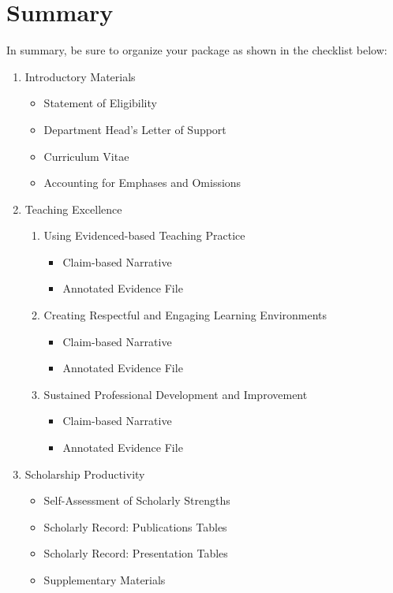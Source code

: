 \documentclass[11pt,titlepage]{article}
\begin{document}
\section*{Summary}  %
In summary, be sure to organize your package as shown in the checklist below:
\begin{enumerate}
  \item Introductory Materials
  \begin{itemize}[label=$\square$]
    \item Statement of Eligibility
    \item Department Head's Letter of Support
    \item Curriculum Vitae
    \item Accounting for Emphases and Omissions
  \end{itemize}

  \item Teaching Excellence
  \begin{enumerate}
    \item Using Evidenced-based Teaching Practice
    \begin{itemize}[label=$\square$]
      \item Claim-based Narrative
      \item Annotated Evidence File
    \end{itemize}

    \item Creating Respectful and Engaging Learning Environments
    \begin{itemize}[label=$\square$]
      \item Claim-based Narrative
      \item Annotated Evidence File
    \end{itemize}

    \item Sustained Professional Development and Improvement
    \begin{itemize}[label=$\square$]
      \item Claim-based Narrative
      \item Annotated Evidence File
    \end{itemize}
  \end{enumerate}

  \item Scholarship Productivity
  \begin{itemize}[label=$\square$]
    \item Self-Assessment of Scholarly Strengths
    \item Scholarly Record: Publications Tables
    \item Scholarly Record: Presentation Tables
    \item Supplementary Materials
  \end{itemize}


\end{enumerate}
\end{document}
